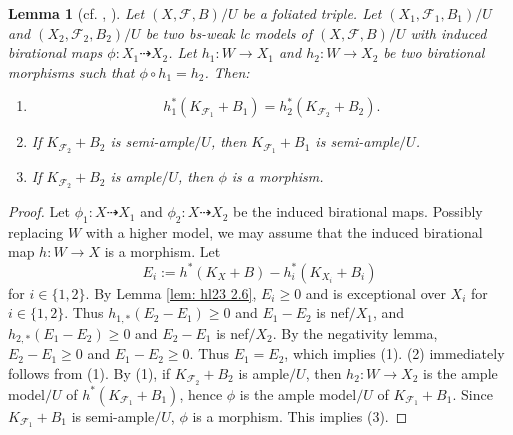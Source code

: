 \documentclass[11pt]{amsart}
\numberwithin{equation}{section}
\newcommand{\Ff}{\mathcal{F}}
\newtheorem{lem}[thm]{Lemma}
\theoremstyle{definition}
\theoremstyle{definition}
\theoremstyle{definition}
\begin{document}
\begin{lem}[cf.{ \cite[Remark 2.7]{Bir12}, \cite[Lemma 3.5]{HL23}}]\label{lem: g-pair version bir12 2.7}
Let $(X,\Ff,B)/U$ be a foliated triple. Let $(X_1,\Ff_1,B_1)/U$ and $(X_2,\Ff_2,B_2)/U$ be two bs-weak lc models of $(X,\Ff,B)/U$ with induced birational maps $\phi: X_1\dashrightarrow X_2$. Let $h_1: W\rightarrow X_1$ and $h_2: W\rightarrow X_2$ be two birational morphisms such that $\phi\circ h_1=h_2$. Then:
\begin{enumerate}
    \item $$h_1^*(K_{\Ff_1}+B_1)=h_2^*(K_{\Ff_2}+B_2).$$
    \item If $K_{\Ff_2}+B_2$ is semi-ample$/U$, then $K_{\Ff_1}+B_1$ is semi-ample$/U$.
    \item If $K_{\Ff_2}+B_2$ is ample$/U$, then $\phi$ is a morphism.
\end{enumerate}
\end{lem}
\begin{proof}
Let $\phi_1: X\dashrightarrow X_1$ and $\phi_2: X\dashrightarrow X_2$ be the induced birational maps. Possibly replacing $W$ with a higher model, we may assume that the induced birational map $h: W\rightarrow X$ is a morphism. Let $$E_i:=h^*(K_X+B)-h_i^*(K_{X_i}+B_i)$$
for $i\in\{1,2\}$. By Lemma \ref{lem: hl23 2.6}, $E_i\geq 0$ and is exceptional over $X_i$ for $i\in\{1,2\}$. Thus $h_{1,*}(E_2-E_1)\geq 0$ and $E_1-E_2$ is nef$/X_1$, and $h_{2,*}(E_1-E_2)\geq 0$ and $E_2-E_1$ is nef$/X_2$. By the negativity lemma, $E_2-E_1\geq 0$ and $E_1-E_2\geq 0$. Thus $E_1=E_2$, which implies (1). (2) immediately follows from (1). By (1), if $K_{\Ff_2}+B_2$ is ample$/U$, then $h_2: W\rightarrow X_2$ is the ample model$/U$ of $h^*(K_{\Ff_1}+B_1)$, hence $\phi$ is the ample model$/U$ of $K_{\Ff_1}+B_1$. Since $K_{\Ff_1}+B_1$ is semi-ample$/U$, $\phi$ is a morphism. This implies (3).
\end{proof}
\end{document}

